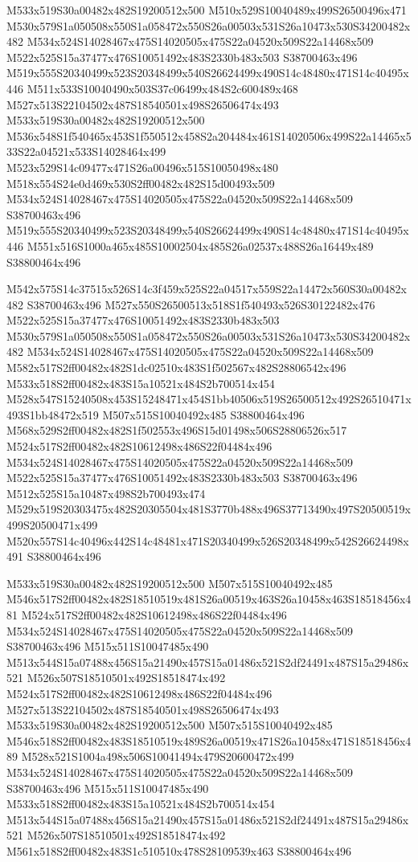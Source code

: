 \documentclass{article}
\begin{document}
\begin{multicols}{2}
M533x519S30a00482x482S19200512x500 M510x529S10040489x499S26500496x471 M530x579S1a050508x550S1a058472x550S26a00503x531S26a10473x530S34200482x482 M534x524S14028467x475S14020505x475S22a04520x509S22a14468x509 M522x525S15a37477x476S10051492x483S2330b483x503 S38700463x496 M519x555S20340499x523S20348499x540S26624499x490S14c48480x471S14c40495x446 M511x533S10040490x503S37c06499x484S2c600489x468 M527x513S22104502x487S18540501x498S26506474x493 M533x519S30a00482x482S19200512x500 M536x548S1f540465x453S1f550512x458S2a204484x461S14020506x499S22a14465x533S22a04521x533S14028464x499 M523x529S14c09477x471S26a00496x515S10050498x480 M518x554S24e0d469x530S2ff00482x482S15d00493x509 M534x524S14028467x475S14020505x475S22a04520x509S22a14468x509 S38700463x496 M519x555S20340499x523S20348499x540S26624499x490S14c48480x471S14c40495x446 M551x516S1000a465x485S10002504x485S26a02537x488S26a16449x489 S38800464x496

M542x575S14c37515x526S14c3f459x525S22a04517x559S22a14472x560S30a00482x482 S38700463x496 M527x550S26500513x518S1f540493x526S30122482x476 M522x525S15a37477x476S10051492x483S2330b483x503 M530x579S1a050508x550S1a058472x550S26a00503x531S26a10473x530S34200482x482 M534x524S14028467x475S14020505x475S22a04520x509S22a14468x509 M582x517S2ff00482x482S1dc02510x483S1f502567x482S28806542x496 M533x518S2ff00482x483S15a10521x484S2b700514x454 M528x547S15240508x453S15248471x454S1bb40506x519S26500512x492S26510471x493S1bb48472x519 M507x515S10040492x485 S38800464x496 M568x529S2ff00482x482S1f502553x496S15d01498x506S28806526x517 M524x517S2ff00482x482S10612498x486S22f04484x496 M534x524S14028467x475S14020505x475S22a04520x509S22a14468x509 M522x525S15a37477x476S10051492x483S2330b483x503 S38700463x496 M512x525S15a10487x498S2b700493x474 M529x519S20303475x482S20305504x481S3770b488x496S37713490x497S20500519x499S20500471x499 M520x557S14c40496x442S14c48481x471S20340499x526S20348499x542S26624498x491 S38800464x496

M533x519S30a00482x482S19200512x500 M507x515S10040492x485 M546x517S2ff00482x482S18510519x481S26a00519x463S26a10458x463S18518456x481 M524x517S2ff00482x482S10612498x486S22f04484x496 M534x524S14028467x475S14020505x475S22a04520x509S22a14468x509 S38700463x496 M515x511S10047485x490 M513x544S15a07488x456S15a21490x457S15a01486x521S2df24491x487S15a29486x521 M526x507S18510501x492S18518474x492 M524x517S2ff00482x482S10612498x486S22f04484x496 M527x513S22104502x487S18540501x498S26506474x493 M533x519S30a00482x482S19200512x500 M507x515S10040492x485 M546x518S2ff00482x483S18510519x489S26a00519x471S26a10458x471S18518456x489 M528x521S1004a498x506S10041494x479S20600472x499 M534x524S14028467x475S14020505x475S22a04520x509S22a14468x509 S38700463x496 M515x511S10047485x490 M533x518S2ff00482x483S15a10521x484S2b700514x454 M513x544S15a07488x456S15a21490x457S15a01486x521S2df24491x487S15a29486x521 M526x507S18510501x492S18518474x492 M561x518S2ff00482x483S1c510510x478S28109539x463 S38800464x496


\end{multicols}
\end{document}
